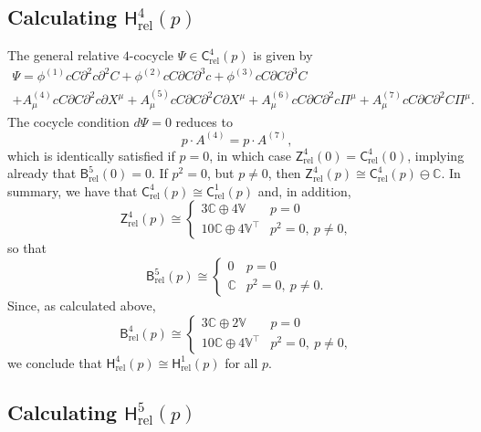 \documentclass[11pt,reqno,a4paper,final]{amsart}
\theoremstyle{plain}
\theoremstyle{definition}
\renewcommand{\d}{\partial}
\newcommand{\Crel}{\mathsf{C}_{\mathrm{rel}}} %
\newcommand{\Hrel}{\mathsf{H}_{\mathrm{rel}}}
\newcommand{\Brel}{\mathsf{B}_{\mathrm{rel}}}
\newcommand{\Zrel}{\mathsf{Z}_{\mathrm{rel}}}
\newcommand{\VV}{\mathbb{V}}
\newcommand{\CC}{\mathbb{C}}
\newcommand{\1}{\mathbb{1}}
\numberwithin{equation}{section}
\begin{document}
\subsection{Calculating $\Hrel^4(p)$}
\label{sec:calculating-hrel4p}

The general relative $4$-cocycle $\Psi \in \Crel^4(p)$ is given by
\begin{multline}
  \Psi = \phi^{(1)} c C \d^2 c \d^2 C + \phi^{(2)} c C \d C \d^3 c +  \phi^{(3)} c C \d C \d^3 C\\
  + A^{(4)}_\mu c C \d C \d^2 c \d X^\mu + A^{(5)}_\mu c C \d C \d^2 C \d X^\mu + A^{(6)}_\mu c C \d C \d^2 c \Pi^\mu + A^{(7)}_\mu c C \d C \d^2 C \Pi^\mu.
\end{multline}
The cocycle condition $d\Psi = 0$ reduces to
\begin{equation}
  p \cdot A^{(4)} = p \cdot A^{(7)},
\end{equation}
which is identically satisfied if $p=0$, in which case $\Zrel^4(0) =
\Crel^4(0)$, implying already that $\Brel^5(0) = 0$.  If $p^2=0$, but
$p\neq 0$, then $\Zrel^4(p) \cong \Crel^4(p) \ominus \CC$.  In
summary, we have that $\Crel^4(p) \cong \Crel^1(p)$ and, in addition,
\begin{equation}
  \label{eq:Z4rel-as-reps}
  \Zrel^4(p) \cong
  \begin{cases}
    3 \CC \oplus 4 \VV & p=0\\
    10\CC \oplus 4 \VV^\top & p^2=0,~p\neq 0,
  \end{cases}
\end{equation}
so that
\begin{equation}
  \label{eq:B5rel-as-reps}
  \Brel^5(p) \cong
  \begin{cases}
    0 & p = 0\\
    \CC & p^2=0,~p\neq 0.
  \end{cases}
\end{equation}
Since, as calculated above,
\begin{equation}
  \Brel^4(p) \cong
  \begin{cases}
    3 \CC \oplus 2 \VV  & p = 0\\
    10 \CC \oplus 4 \VV^\top & p^2=0,~p\neq 0,
  \end{cases}
\end{equation}
we conclude that $\Hrel^4(p) \cong \Hrel^1(p)$ for all $p$.

\subsection{Calculating $\Hrel^5(p)$}
\label{sec:calculating-hrel5p}
\end{document}
